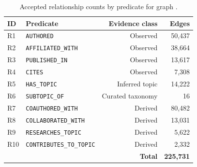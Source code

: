 \begin{table}[!htbp]
  \centering
  \caption[Accepted relationships by predicate]{Accepted relationship counts by predicate for graph \GraphVersion.}
  \label{tab:relation-counts}
  \begin{tabular}{llrr}
    \toprule
    \textbf{ID} & \textbf{Predicate} & \textbf{Evidence class} & \textbf{Edges}\\
    \midrule
    R1 & \texttt{AUTHORED} & Observed & 50,437\\
    R2 & \texttt{AFFILIATED\_WITH} & Observed & 38,664\\
    R3 & \texttt{PUBLISHED\_IN} & Observed & 13,617\\
    R4 & \texttt{CITES} & Observed & 7,308\\
    R5 & \texttt{HAS\_TOPIC} & Inferred topic & 14,222\\
    R6 & \texttt{SUBTOPIC\_OF} & Curated taxonomy & 16\\
    R7 & \texttt{COAUTHORED\_WITH} & Derived & 80,482\\
    R8 & \texttt{COLLABORATED\_WITH} & Derived & 13,031\\
    R9 & \texttt{RESEARCHES\_TOPIC} & Derived & 5,622\\
    R10 & \texttt{CONTRIBUTES\_TO\_TOPIC} & Derived & 2,332\\
    \midrule
    \multicolumn{3}{r}{\textbf{Total}} & \textbf{225,731}\\
    \bottomrule
  \end{tabular}
\end{table}
